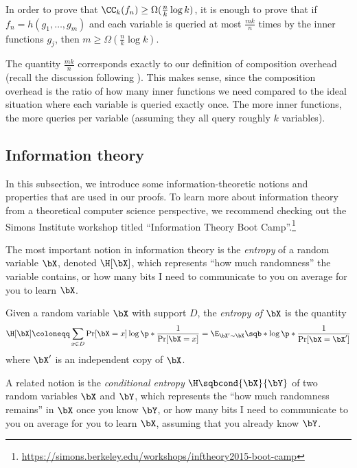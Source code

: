 \begin{corollary}
\label{cor:wlog}
In order to prove that $\CC_k(f_n) \geq \Omega(\frac{n}{k} \log k)$, it is enough to prove that if $f_n = h(g_1, \ldots, g_m)$ and each variable is queried at most $\frac{mk}{n}$ times by the inner functions $g_j$, then $m \geq \Omega(\frac{n}{k} \log k)$.
\end{corollary}

\begin{remark}
The quantity $\frac{mk}{n}$ corresponds exactly to our definition of composition overhead (recall the discussion following ).
This makes sense, since the composition overhead is the ratio of how many inner functions we need compared to the ideal situation where each variable is queried exactly once.
The more inner functions, the more queries per variable (assuming they all query roughly $k$ variables).
\end{remark}

\subsection{Information theory}
In this subsection, we introduce some information-theoretic notions and properties that are used in our proofs.
To learn more about information theory from a theoretical computer science perspective, we recommend checking out the Simons Institute workshop titled ``Information Theory Boot Camp''.\footnote{\url{https://simons.berkeley.edu/workshops/inftheory2015-boot-camp}}

The most important notion in information theory is the \emph{entropy} of a random variable $\bX$, denoted $\H[\bX]$, which represents ``how much randomness'' the variable contains, or how many bits I need to communicate to you on average for you to learn $\bX$.
\begin{definition}[entropy]
Given a random variable $\bX$ with support $D$, the \emph{entropy of $\bX$} is the quantity
\[
\H[\bX] \coloneqq \sum_{x \in D} \Pr[\bX = x] \log \p*{\frac{1}{\Pr[\bX = x]}} = \E_{\bX' \sim \bX}\sqb*{\log \p*{\frac{1}{\Pr[\bX = \bX']}}}
\]
where $\bX'$ is an independent copy of $\bX$.
\end{definition}

A related notion is the \emph{conditional entropy} $\H\sqbcond{\bX}{\bY}$ of two random variables $\bX$ and $\bY$, which represents the ``how much randomness remains'' in $\bX$ once you know $\bY$, or how many bits I need to communicate to you on average for you to learn $\bX$, assuming that you already know $\bY$.

